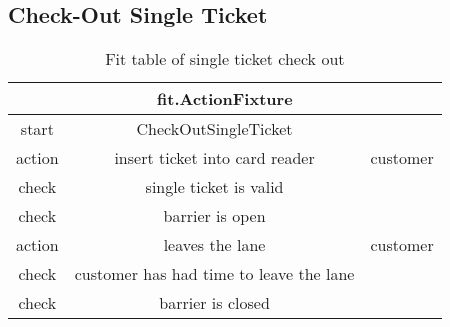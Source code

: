 \subsection{Check-Out Single Ticket}
\begin{table}
\begin{centering}
\begin{tabular}{|c|c|c||c||c||c|}
\hline 
\multicolumn{6}{|c}{fit.ActionFixture}\tabularnewline
\hline 
start & CheckOutSingleTicket & \multicolumn{4}{c}{}\tabularnewline
\hline 
action & insert ticket into card reader & \multicolumn{4}{c}{customer}\tabularnewline
\hline 
check & single ticket is valid & \multicolumn{4}{c}{}\tabularnewline
\hline 
check & barrier is open & \multicolumn{4}{c}{}\tabularnewline
\hline 
action & leaves the lane & \multicolumn{4}{c}{customer}\tabularnewline
\hline 
check & customer has had time to leave the lane & \multicolumn{4}{c}{}\tabularnewline
\hline 
check & barrier is closed & \multicolumn{4}{c}{}\tabularnewline
\hline 
\end{tabular}
\par\end{centering}

\caption{Fit table of single ticket check out}
\end{table}
